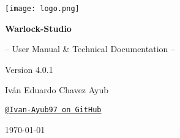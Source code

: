 \documentclass[11pt, a4paper]{article}
\begin{document}
\begin{titlepage}
    \begin{tcolorbox}[
        colback=WarlockDark,                    %
        colframe=WarlockGold,                   %
        sharp corners,                          %
        boxrule=1.5pt,                          %
        halign=center,                          %
        valign=center,                          %
        height=\dimexpr\textheight-1cm\relax    %
      ]
      \centering %

      \texttt{[image: logo.png]}\par %

      \vfill %

      \color{white} %

      {\Huge\bfseries Warlock-Studio\par}
      \vspace{0.7cm} %
      {\Large -- User Manual \& Technical Documentation --\par}
      \vspace{0.2cm}
      {\Large Version 4.0.1\par}

      \vfill %

      {\large Iván Eduardo Chavez Ayub\par}
      \href{https://github.com/Ivan-Ayub97}{\texttt{\color{WarlockGold}@Ivan-Ayub97 on GitHub}}\par %

      \vspace{1.5cm}

      {\large \today\par} %
    \end{tcolorbox}
    \thispagestyle{empty} %
\end{titlepage}


\pagestyle{fancy} %
\end{document}
